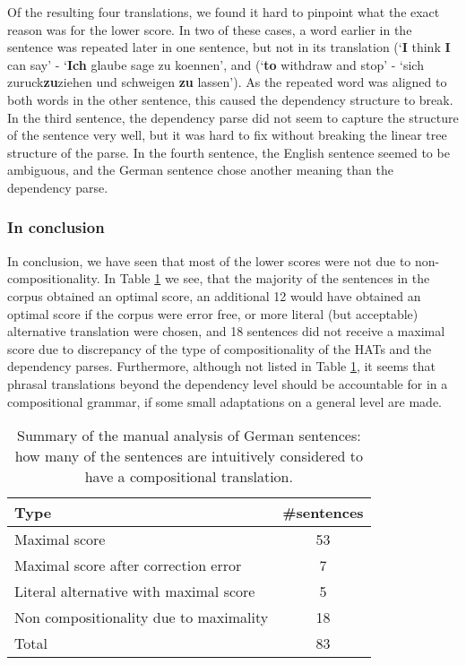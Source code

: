Of the resulting four translations, we found it hard to pinpoint what the exact reason was for the lower score. In two of these cases, a word earlier in the sentence was repeated later in one sentence, but not in its translation (`\textbf{I} think \textbf{I} can say' - `\textbf{Ich} glaube sage zu koennen', and (`\textbf{to} withdraw and stop' - `sich zuruck\textbf{zu}ziehen und schweigen \textbf{zu} lassen'). As the repeated word was aligned to both words in the other sentence, this caused the dependency structure to break. In the third sentence, the dependency parse did not seem to capture the structure of the sentence very well, but it was hard to fix without breaking the linear tree structure of the parse. In the fourth sentence, the English sentence seemed to be ambiguous, and the German sentence chose another meaning than the dependency parse.

\subsubsection{In conclusion}

In conclusion, we have seen that most of the lower scores were not due to non-compositionality. In Table \ref{tab:optimal_score} we see, that the majority of the sentences in the corpus obtained an optimal score, an additional 12 would have obtained an optimal score if the corpus were error free, or more literal (but acceptable) alternative translation were chosen, and 18 sentences did not receive a maximal score due to discrepancy of the type of compositionality of the HATs and the dependency parses. Furthermore, although not listed in Table \ref{tab:optimal_score}, it seems that phrasal translations beyond the dependency level should be accountable for in a compositional grammar, if some small adaptations on a general level are made.

\begin{table}[!ht]
\centering
\begin{tabular}{|l|c|}
\hline
\textbf{Type} & \textbf{\#sentences}\\
\hline
\hline
Maximal score & 53 \\
\hline
Maximal score after correction error & 7\\
\hline
Literal alternative with maximal score & 5\\
\hline
Non compositionality due to maximality & 18\\
\hline
Total & 83\\
\hline
\end{tabular}
\caption{Summary of the manual analysis of German sentences: how many of the sentences are intuitively considered to have a compositional translation.}\label{tab:optimal_score}
\end{table}

